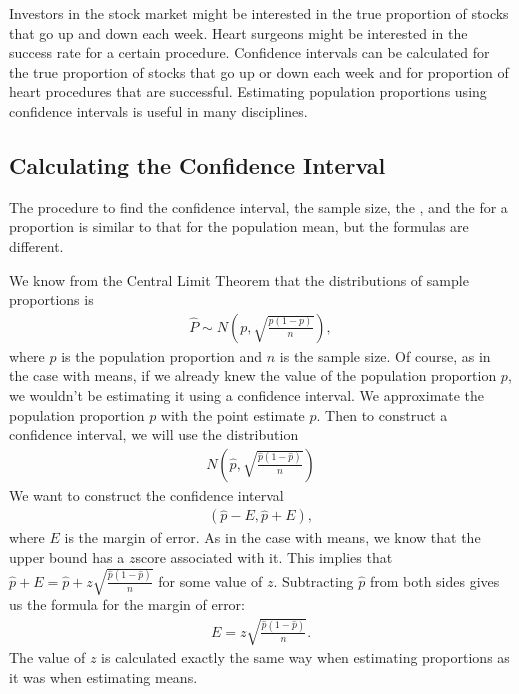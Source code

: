\documentclass[letterpaper,10pt,english]{jupyterBook}
\begin{document}
\sphinxAtStartPar
Investors in the stock market might be interested in the true proportion of stocks that go up and down each week. Heart surgeons might be interested in the success rate for a certain procedure. Confidence intervals can be calculated for the true proportion of stocks that go up or down each week and for proportion of heart procedures that are successful. Estimating population proportions using confidence intervals is useful in many disciplines.


\subsection{Calculating the Confidence Interval}
\label{\detokenize{Ch5 Confidence Intervals/5.2 Estimating Population Proportions:calculating-the-confidence-interval}}
\sphinxAtStartPar
The procedure to find the confidence interval, the sample size, the , and the  for a proportion is similar to that for the population mean, but the formulas are different.

\sphinxAtStartPar
We know from the Central Limit Theorem that the distributions of sample proportions is
\begin{equation*}
\begin{split} \hat{P} \sim N\left(p, \sqrt{\frac{p(1 - p)}{n}}\right), \end{split}
\end{equation*}
\sphinxAtStartPar
where \(p\) is the population proportion and \(n\) is the sample size. Of course, as in the case with means, if we already knew the value of the population proportion \(p\), we wouldn’t be estimating it using a confidence interval. We approximate the population proportion \(p\) with the point estimate \(\hat{p}\). Then to construct a confidence interval, we will use the distribution
\begin{equation*}
\begin{split} N\left(\hat{p}, \sqrt{\frac{\hat{p}(1 - \hat{p})}{n}}\right) \end{split}
\end{equation*}
\sphinxAtStartPar
We want to construct the confidence interval
\begin{equation*}
\begin{split} (\hat{p} - E, \hat{p} + E), \end{split}
\end{equation*}
\sphinxAtStartPar
where \(E\) is the margin of error. As in the case with means, we know that the upper bound has a \(z\)\sphinxhyphen{}score associated with it. This implies that \(\hat{p} + E = \hat{p} + z\sqrt{\frac{\hat{p}(1-\hat{p})}{n}}\) for some value of \(z\). Subtracting \(\hat{p}\) from both sides gives us the formula for the margin of error:
\begin{equation*}
\begin{split} E = z\sqrt{\frac{\hat{p}(1 - \hat{p})}{n}}. \end{split}
\end{equation*}
\sphinxAtStartPar
The value of \(z\) is calculated exactly the same way when estimating proportions as it was when estimating means.
\end{document}
